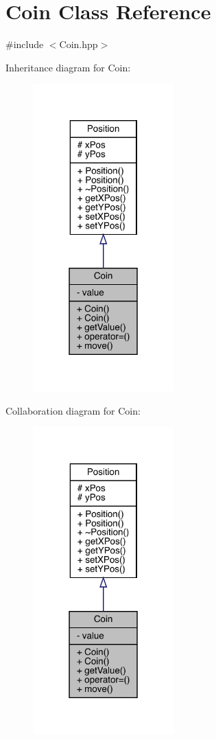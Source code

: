 \hypertarget{class_coin}{}\section{Coin Class Reference}
\label{class_coin}


{\ttfamily \#include $<$Coin.\+hpp$>$}



Inheritance diagram for Coin\+:
\nopagebreak
\begin{figure}[H]
\begin{center}
\leavevmode
\includegraphics[width=154pt]{class_coin__inherit__graph}
\end{center}
\end{figure}


Collaboration diagram for Coin\+:
\nopagebreak
\begin{figure}[H]
\begin{center}
\leavevmode
\includegraphics[width=154pt]{class_coin__coll__graph}
\end{center}
\end{figure}
